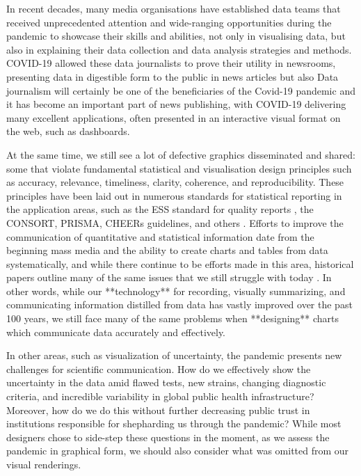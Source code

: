 \documentclass[article]{jdssv}\usepackage[]{graphicx}\usepackage[]{xcolor}
\begin{document}
In recent decades, many media organisations have established data teams that received unprecedented attention and wide-ranging opportunities during the pandemic to showcase their skills and abilities, not only in visualising data, but also in explaining their data collection and data analysis strategies and methods. COVID-19 allowed these data journalists to prove their utility in newsrooms, presenting data in digestible form to the public in news articles but also Data journalism will certainly be one of the beneficiaries of the Covid-19 pandemic and it has become an important part of news publishing, with COVID-19 delivering many excellent applications, often presented in an interactive visual format on the web, such as dashboards\citep{kochWelcomeRevolutionCOVID192021}.


At the same time, we still see a lot of defective graphics disseminated and shared: some that violate fundamental statistical and visualisation design principles such as accuracy, relevance, timeliness, clarity, coherence, and reproducibility. 
These principles have been laid out in numerous standards for statistical reporting in the application areas, such as the ESS standard for quality reports \citep{ess2009}, the CONSORT, PRISMA, CHEERs guidelines, and others \citep{EQUATORNetworkEnhancing}. 
Efforts to improve the communication of quantitative and statistical information date from the beginning mass media and the ability to create charts and tables from data systematically, and while there continue to be efforts made in this area, historical papers outline many of the same issues that we still struggle with today \citep{ASA-standards,haemerPresentationProblemsArea1949,kovermanPLANNINGVISUALPRESENTATION1961,fienbergGraphicalMethodsStatistics1979,Hoffrage2261,Tufte2001,Rosling2011,otavamylona2020}.
In other words, while our **technology** for recording, visually summarizing, and communicating information distilled from data has vastly improved over the past 100 years, we still face many of the same problems when **designing** charts which communicate data accurately and effectively.

In other areas, such as visualization of uncertainty, the pandemic presents new challenges for scientific communication. How do we effectively show the uncertainty in the data amid flawed tests, new strains, changing diagnostic criteria, and incredible variability in global public health infrastructure? Moreover, how do we do this without further decreasing public trust in institutions responsible for shepharding us through the pandemic? While most designers chose to side-step these questions in the moment, as we assess the pandemic in graphical form, we should also consider what was omitted from our visual renderings.
\end{document}
